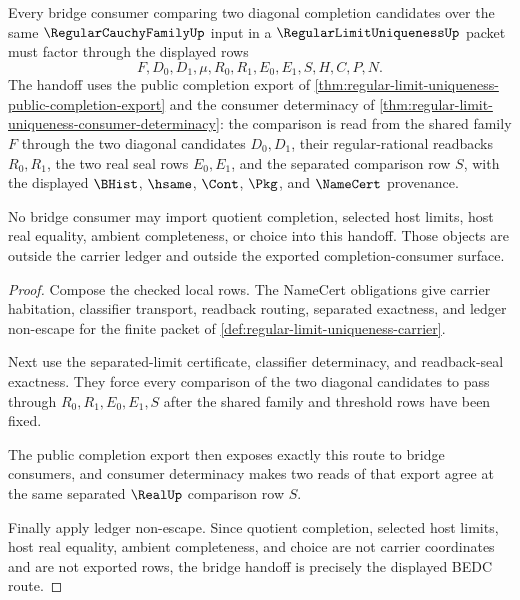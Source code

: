 \begin{theorem}
\label{thm:regular-limit-uniqueness-bridge-handoff}
Every bridge consumer comparing two diagonal completion candidates over the same $\RegularCauchyFamilyUp$ input in a $\RegularLimitUniquenessUp$ packet must factor through the displayed rows
$$
F,D_0,D_1,\mu,R_0,R_1,E_0,E_1,S,H,C,P,N.
$$
The handoff uses the public completion export of \autoref{thm:regular-limit-uniqueness-public-completion-export} and the consumer determinacy of \autoref{thm:regular-limit-uniqueness-consumer-determinacy}: the comparison is read from the shared family $F$ through the two diagonal candidates $D_0,D_1$, their regular-rational readbacks $R_0,R_1$, the two real seal rows $E_0,E_1$, and the separated comparison row $S$, with the displayed $\BHist$, $\hsame$, $\Cont$, $\Pkg$, and $\NameCert$ provenance.

No bridge consumer may import quotient completion, selected host limits, host real equality, ambient completeness, or choice into this handoff. Those objects are outside the carrier ledger and outside the exported completion-consumer surface.
\end{theorem}
\begin{proof}
Compose the checked local rows. The NameCert obligations give carrier habitation, classifier transport, readback routing, separated exactness, and ledger non-escape for the finite packet of \autoref{def:regular-limit-uniqueness-carrier}.

Next use the separated-limit certificate, classifier determinacy, and readback-seal exactness. They force every comparison of the two diagonal candidates to pass through $R_0,R_1,E_0,E_1,S$ after the shared family and threshold rows have been fixed.

The public completion export then exposes exactly this route to bridge consumers, and consumer determinacy makes two reads of that export agree at the same separated $\RealUp$ comparison row $S$.

Finally apply ledger non-escape. Since quotient completion, selected host limits, host real equality, ambient completeness, and choice are not carrier coordinates and are not exported rows, the bridge handoff is precisely the displayed BEDC route.
\end{proof}

